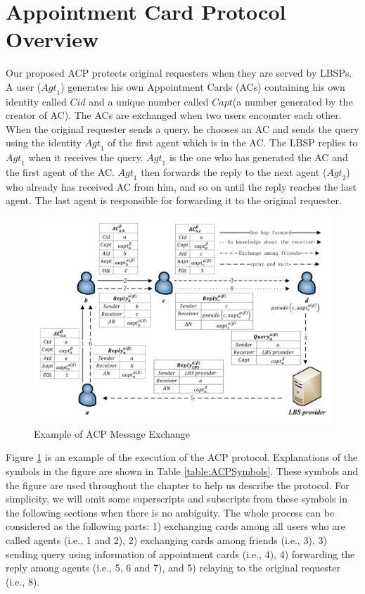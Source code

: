 \section{ Appointment Card Protocol Overview}

\noindent Our proposed ACP protects original requesters when they are served by LBSPs. A user (${Agt}_{1}$) generates his own Appointment Cards (ACs) containing his own identity called $Cid$ and a unique number called $Capt$(a number generated by the creator of AC). The ACs are exchanged when two users encounter each other. When the original requester sends a query, he chooses an AC and sends the query using the identity ${Agt}_{1}$ of the first agent which is in the AC. The LBSP replies to ${Agt}_{1}$ when it receives the query. ${Agt}_{1}$ is the one who has generated the AC and the first agent of the AC. ${Agt}_{1}$ then forwards the reply to the next agent (${Agt}_{2}$) who already has received AC from him, and so on until the reply reaches the last agent. The last agent is responsible for forwarding it to the original requester.

\begin{figure} [H]
  \centering 
  \includegraphics[width=6.0in]{figures/FIG_4_1_Example_of_ACP_Message_Exchange.png}
  \caption{Example of ACP Message Exchange} 
  \label{fig:EoACPME} %
\end{figure}


Figure \ref{fig:EoACPME} is an example of the execution of the ACP protocol. Explanations of the symbols in the figure are shown in Table \ref{table:ACPSymbols}. These symbols and the figure are used throughout the chapter to help us describe the protocol. For simplicity, we will omit some superscripts and subscripts from these symbols in the following sections when there is no ambiguity. The whole process can be considered as the following parts: 1) exchanging cards among all users who are called agents (i.e., 1 and 2), 2) exchanging cards among friends (i.e., 3), 3) sending query using information of appointment cards (i.e., 4), 4) forwarding the reply among agents (i.e., 5, 6 and 7), and 5) relaying to the original requester (i.e., 8). 


